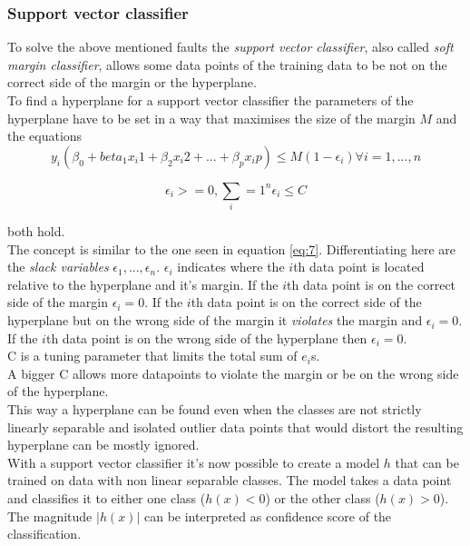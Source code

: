 \subsubsection*{Support vector classifier}

To solve the above mentioned faults the \emph{support vector classifier}, also called \emph{soft margin classifier}, allows some data points of the training data to be not on the correct side of the margin or the hyperplane. 
\\
To find a hyperplane for a support vector classifier the parameters of the hyperplane have to be set in a way that maximises the size of the margin $M$ and the equations 
\begin{equation} \label{eq:8}
y_i(\beta_0+beta_1 x_i1 +\beta_2 x_i2 + ... +\beta_p x_ip) \leq M(1- \epsilon_i ) \forall i=1,...,n
\end{equation}

\begin{equation} \label{eq:9}
\epsilon_i >= 0, \sum_i=1^n \epsilon_i \leq	 C
\end{equation}

both hold.\\
The concept is similar to the one seen in equation \ref{eq:7}. Differentiating here are the \emph{slack variables} $\epsilon_1, ..., \epsilon_n$. $\epsilon_i$ indicates where the $i$th data point is located relative to the hyperplane and it's margin. If the $i$th data point is on the correct side of the margin $\epsilon_i=0$. If the $i$th data point is on the correct side of the hyperplane but on the wrong side of the margin it \emph{violates} the margin and $\epsilon_i=0$. If the $i$th data point is on the wrong side of the hyperplane then $\epsilon_i=0$.  \\
C is a tuning parameter that limits the total sum of $e_i$s.\\
A bigger C allows more datapoints to violate the margin or be on the wrong side of the hyperplane. \\
This way a hyperplane can be found even when the classes are not strictly linearly separable and isolated outlier data points that would  distort the resulting hyperplane can be mostly ignored.\\


With a support vector classifier it's now possible to create a model $h$ that can be trained on data with non linear separable classes. The model takes a data point and classifies it to either one class ($h(x)<0$) or the other class ($h(x)>0$). The magnitude $|h(x)|$ can be interpreted as confidence score of the classification.
 
